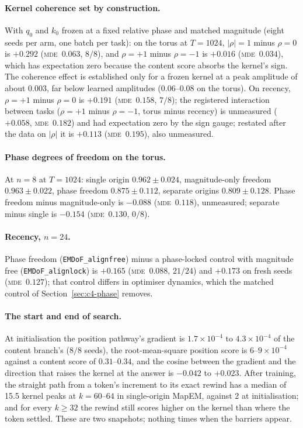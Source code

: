 \documentclass[10pt]{article}
\newcommand{\mde}{\textsc{mde}}
\newcommand{\arm}[1]{\texttt{#1}}
\begin{document}
\paragraph{Kernel coherence set by construction.} With $q_0$ and $k_0$ frozen at a fixed relative phase and
matched magnitude (eight seeds per arm, one batch per task): on the torus at $T=1024$, $|\rho|=1$ minus $\rho=0$
is $+0.292$ (\mde\ $0.063$, $8/8$), and $\rho=+1$ minus $\rho=-1$ is $+0.016$ (\mde\ $0.034$), which has expectation
zero because the content score absorbs the kernel's sign. The coherence effect is established only for a frozen
kernel at a peak amplitude of about 0.003, far below learned amplitudes (0.06--0.08 on the torus). On recency,
$\rho=+1$ minus $\rho=0$ is $+0.191$ (\mde\ $0.158$, $7/8$); the registered interaction between tasks ($\rho=+1$ minus
$\rho=-1$, torus minus recency) is unmeasured ($+0.058$, \mde\ $0.182$) and had expectation zero by the sign
gauge; restated after the data on $|\rho|$ it is $+0.113$ (\mde\ $0.195$), also unmeasured. %

\paragraph{Phase degrees of freedom on the torus.} At $n=8$ at $T=1024$: single origin $0.962\pm0.024$,
magnitude-only freedom $0.963\pm0.022$, phase freedom $0.875\pm0.112$, separate origins $0.809\pm0.128$. Phase
freedom minus magnitude-only is $-0.088$ (\mde\ $0.118$), unmeasured; separate minus single is $-0.154$ (\mde\
$0.130$, $0/8$). %

\paragraph{Recency, $n=24$.} Phase freedom (\arm{EMDoF\_alignfree}) minus a phase-locked control with magnitude free (\arm{EMDoF\_alignlock}) is $+0.165$
(\mde\ $0.088$, $21/24$) and $+0.173$ on fresh seeds (\mde\ $0.127$); that control differs in optimiser dynamics,
which the matched control of Section~\ref{sec:c4-phase} removes. %

\paragraph{The start and end of search.} At initialisation the position pathway's gradient is $1.7\times10^{-4}$ to
$4.3\times10^{-4}$ of the content branch's ($8/8$ seeds), the root-mean-square position score is $6$--$9\times10^{-4}$
against a content score of $0.31$--$0.34$, and the cosine between the gradient and the direction that raises the
kernel at the answer is $-0.042$ to $+0.023$. After training, the straight path from a token's increment to its
exact rewind has a median of 15.5 kernel peaks at $k=60$--$64$ in single-origin MapEM, against 2 at
initialisation; and for every $k\ge32$ the rewind still scores higher on the kernel than where the token settled.
These are two snapshots; nothing times when the barriers appear. %
\end{document}
